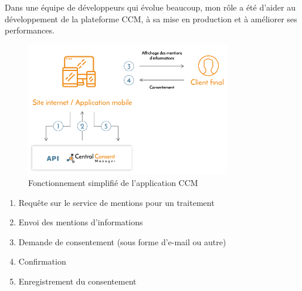 \documentclass[12pt, a4paper]{report}
\begin{document}
Dans une équipe de développeurs qui évolue beaucoup, mon rôle a été d'aider au développement de la plateforme CCM, à sa mise en production et à améliorer ses performances.
\begin{figure}[H]
    \begin{center}
        \includegraphics[width=0.8\textwidth]{ccm.png}
    \end{center}
    \caption{Fonctionnement simplifié de l'application CCM}
\end{figure}
\begin{enumerate}
    \item Requête sur le service de mentions pour un traitement
    \item Envoi des mentions d'informations
    \item Demande de consentement (sous forme d'e-mail ou autre)
    \item Confirmation
    \item Enregistrement du consentement
\end{enumerate}
\end{document}

